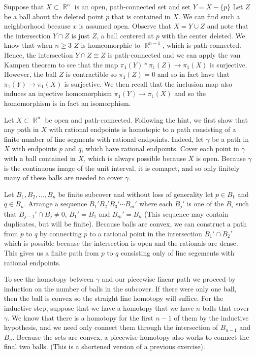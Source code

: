 \documentclass{article}
\DeclareMathOperator{\R}{\mathbb{R}}
\newcommand{\exercise}[1]{\noindent{\textbf{Exercise #1:}}}
\begin{document}
\exercise{A2}

Suppose that $X\subset \R^n$ is an open, path-connected set and set $Y
= X - \{p\}$ Let $Z$ be a ball about the deleted point $p$ that is
contained in $X$. We can find such a neighborhood because $x$ is
assumed open. Observe that $X = Y \cup Z$ and note that the
intersection $Y \cap Z$ is just $Z$, a ball centered at $p$ with the
center deleted. We know that when $n \geq 3$ $Z$ is homeomorphic to
$\R^{n-1}$, which is path-connected. Hence, the intersection $Y \cap Z
\cong Z$ is path-connected and we can apply the van Kampen theorem to
see that the map $\pi_1(Y) \ast \pi_1(Z) \to \pi_1(X)$ is
surjective. However, the ball $Z$ is contractible so $\pi_1(Z) = 0$
and so in fact have that $\pi_1(Y) \to \pi_1(X)$ is surjective. We
then recall that the inclusion map also induces an injective
homomorphism $\pi_1(Y) \to \pi_1(X)$ and so the homomorphism is in
fact an isomorphism.

\exercise{A3}

Let $X \subset \R^n$ be open and path-connected. Following the hint,
we first show that any path in $X$ with rational endpoints is
homotopic to a path consisting of a finite number of line segments
with rational endpoints. Indeed, let $\gamma$ be a path in $X$ with
endpoints $p$ and $q$, which have rational endpoints. Cover each point
in $\gamma$ with a ball contained in $X$, which is always possible
because $X$ is open. Because $\gamma$ is the continuous image of the
unit interval, it is comapct, and so only finitely many of these balls
are needed to cover $\gamma$.

Let $B_1,B_2,\ldots, B_n$ be finite subcover and without loss of
generality let $p \in B_1$ and $q \in B_n$. Arrange a sequence
$B_1'B_2'B_3'\cdots B_m'$ where each $B_j'$ is one of the $B_i$ such
that $B_{j-1}' \cap B_j \neq 0$, $B_1' = B_1$ and $B_m' = B_n$ (This
sequence may contain duplicates, but will be finite). Because balls
are convex, we can construct a path from $p$ to $q$ by connecting $p$
to a rational point in the intersection $B_1' \cap B_2'$ which is
possible because the intersection is open and the rationals are
dense. This gives us a finite path from $p$ to $q$ consisting only of
line segements with rational endpoints.

To see the homotopy between $\gamma$ and our piecewise linear path we
proceed by induction on the number of balls in the subcover. If there
were only one ball, then the ball is convex so the straight line
homotopy will suffice. For the inductive step, suppose that we have a
homotopy that we have $n$ balls that cover $\gamma$. We know that
there is a homotopy for the first $n-1$ of them by the inductive
hypothesis, and we need only connect them through the intersection of
$B_{n-1}$ and $B_n$. Because the sets are convex, a piecewise homotopy
also works to connect the final two balls. (This is a shortened
version of a previous exercise).
\end{document}
